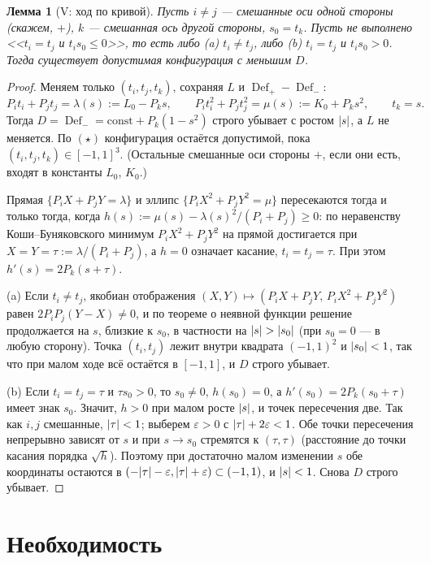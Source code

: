 \documentclass[11pt]{article}
\newtheorem{lemma}[theorem]{Лемма}
\theoremstyle{definition}
\theoremstyle{remark}
\newcommand{\Def}{\operatorname{Def}}
\DeclarePairedDelimiter{\abs}{\lvert}{\rvert}
\begin{document}
\begin{lemma}[V: ход по кривой]\label{lem:V}
Пусть $i\ne j$ --- смешанные оси одной стороны (скажем, $+$), $k$ --- смешанная ось другой стороны,
$s_0=t_k$. Пусть не выполнено <<$t_i=t_j$ и $t_is_0\le0$>>, то есть либо (a) $t_i\ne t_j$, либо (b) $t_i=t_j$ и
$t_is_0>0$. Тогда существует допустимая конфигурация с меньшим $D$.
\end{lemma}
\begin{proof}
Меняем только $(t_i,t_j,t_k)$, сохраняя $L$ и $\Def_+-\Def_-$:
\[
P_it_i+P_jt_j=\lambda(s):=L_0-P_ks,\qquad P_it_i^2+P_jt_j^2=\mu(s):=K_0+P_ks^2,\qquad t_k=s .
\]
Тогда $D=\Def_-=\mathrm{const}+P_k(1-s^2)$ строго убывает с ростом $\abs s$, а $L$ не меняется. По
$(\star)$ конфигурация остаётся допустимой, пока $(t_i,t_j,t_k)\in[-1,1]^3$. (Остальные смешанные оси стороны
$+$, если они есть, входят в константы $L_0$, $K_0$.)

Прямая $\{P_iX+P_jY=\lambda\}$ и эллипс $\{P_iX^2+P_jY^2=\mu\}$ пересекаются тогда и только тогда, когда
$h(s):=\mu(s)-\lambda(s)^2/(P_i+P_j)\ge0$: по неравенству Коши--Буняковского минимум $P_iX^2+P_jY^2$ на прямой
достигается при $X=Y=\tau:=\lambda/(P_i+P_j)$, а $h=0$ означает касание, $t_i=t_j=\tau$. При этом
$h'(s)=2P_k(s+\tau)$.

(a) Если $t_i\ne t_j$, якобиан отображения $(X,Y)\mapsto(P_iX+P_jY,\,P_iX^2+P_jY^2)$ равен
$2P_iP_j(Y-X)\ne0$, и по теореме о неявной функции решение продолжается на $s$, близкие к $s_0$, в частности на
$\abs s>\abs{s_0}$ (при $s_0=0$ --- в любую сторону). Точка $(t_i,t_j)$ лежит внутри квадрата $(-1,1)^2$ и
$\abs{s_0}<1$, так что при малом ходе всё остаётся в $[-1,1]$, и $D$ строго убывает.

(b) Если $t_i=t_j=\tau$ и $\tau s_0>0$, то $s_0\ne0$, $h(s_0)=0$, а $h'(s_0)=2P_k(s_0+\tau)$ имеет знак $s_0$.
Значит, $h>0$ при малом росте $\abs s$, и точек пересечения две. Так как $i,j$ смешанные, $\abs\tau<1$; выберем
$\varepsilon>0$ с $\abs\tau+2\varepsilon<1$. Обе точки пересечения непрерывно зависят от $s$ и при $s\to s_0$
стремятся к $(\tau,\tau)$ (расстояние до точки касания порядка $\sqrt h$). Поэтому при достаточно малом
изменении $s$ обе координаты остаются в $(-\abs\tau-\varepsilon,\abs\tau+\varepsilon)\subset(-1,1)$, и
$\abs s<1$. Снова $D$ строго убывает.
\end{proof}

\section{Необходимость}\label{sec:nec}
\end{document}
